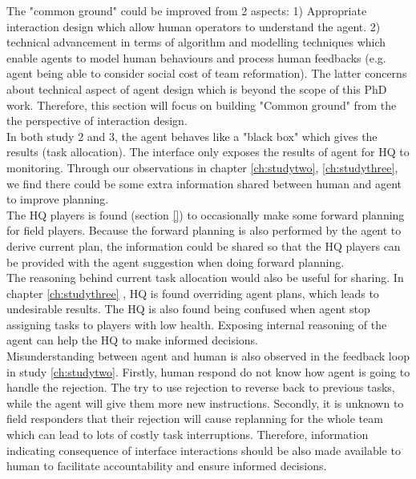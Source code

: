 The "common ground" could be improved from 2 aspects:  1) Appropriate interaction design which allow human operators to understand the agent. 2) technical advancement in terms of algorithm and modelling techniques which enable agents to model human behaviours and process human feedbacks (e.g. agent being able to consider social cost of team reformation). The latter concerns about technical aspect of agent design which is beyond the scope of this PhD work. Therefore, this section will focus on building "Common ground" from the the perspective of interaction design. \\

In both study 2 and 3, the agent behaves like a "black box" which gives the results (task allocation). The interface only exposes the results of agent for HQ to monitoring. Through our observations in chapter \ref{ch:studytwo}, \ref{ch:studythree}, we find there could be some extra information shared between human and agent to improve planning.\\

The HQ players is found (section \ref{}) to occasionally make some forward planning for field players. Because the forward planning is also performed by the agent to derive current plan, the information could be shared so that the HQ players can be provided with the agent suggestion when doing forward planning.\\

The reasoning behind current task allocation would also be useful for sharing. In chapter \ref{ch:studythree} , HQ is found overriding agent plans, which leads to undesirable results. The HQ is also found being confused when agent stop assigning tasks to players with low health. Exposing internal reasoning of the agent can help the HQ to make informed decisions. \\

Misunderstanding between agent and human is also observed in the feedback loop in study \ref{ch:studytwo}. Firstly, human respond do not know how agent is going to handle the rejection. The try to use rejection to reverse back to previous tasks, while the agent will give them more new instructions. Secondly, it is unknown to field responders that their rejection will cause replanning for the whole team which can lead to lots of costly task interruptions. Therefore, information indicating consequence of interface interactions should be also made available to human to facilitate accountability and ensure informed decisions. \\

